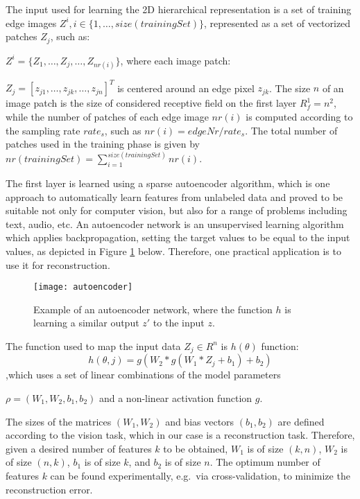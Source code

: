 \documentclass[runningheads]{llncs}
\begin{document}
The input used for learning the 2D hierarchical representation is a set of training edge images $Z^i, i\in \{1,\ldots,size(trainingSet)\}$, represented as a set of vectorized patches $Z_j$, such as:

$Z^i=\{Z_1,\ldots,Z_j,\ldots,Z_{nr(i)}\}$, where each image patch: 

$Z_j=[z_{j1},\ldots,z_{jk},\ldots,z_{jn}]^T$ is centered around an edge pixel $z_{jk}$. The size $n$ of an image patch is the size of considered receptive field on the first layer $R_f^1=n^2$, while the number of patches of each edge image $nr(i)$ is computed according to the sampling rate $rate_s$, such as $nr(i)=edgeNr/rate_s$. The total number of patches used in the training phase is given by $nr(trainingSet)=\sum_{i=1}^{size(trainingSet)}nr(i).$

The first layer is learned using a sparse autoencoder algorithm, which is one approach to automatically learn features from unlabeled data and proved to be suitable not only for computer vision, but also for a range of problems including text, audio, etc. An autoencoder network is an unsupervised learning algorithm which applies backpropagation, setting the target values to be equal to the input values, as depicted in Figure \ref{fig:autoencoder} below. Therefore, one practical application is to use it for reconstruction. 

\begin{figure}
\begin{center}
\texttt{[image: autoencoder]}
\end{center}
\caption{Example of an autoencoder network, where the function $h$ is learning a similar output $z'$ to the input $z$.}
\label{fig:autoencoder}
\end{figure}

The function used to map the input data $Z_j\in R^n$ is $h(\theta)$ function:
\begin{equation}
 h(\theta,j)= g(W_2*g(W_1*Z_j+b_1)+b_2)
\end{equation}
,which uses a set of linear combinations of the model parameters 

$\rho=(W_1,W_2,b_1,b_2)$ and a non-linear activation function $g$.

The sizes of the matrices $(W_1,W_2)$ and bias vectors $(b_1,b_2)$ are defined according to the vision task, which in our case is a reconstruction task. Therefore, given a desired number of features $k$ to be obtained, $W_1$ is of size $(k,n)$, $W_2$ is of size $(n,k)$, $b_1$ is of size $k$, and $b_2$ is of size $n$. The optimum number of features $k$ can be found experimentally, e.g.\ via cross-validation, to minimize the reconstruction error.
\end{document}
